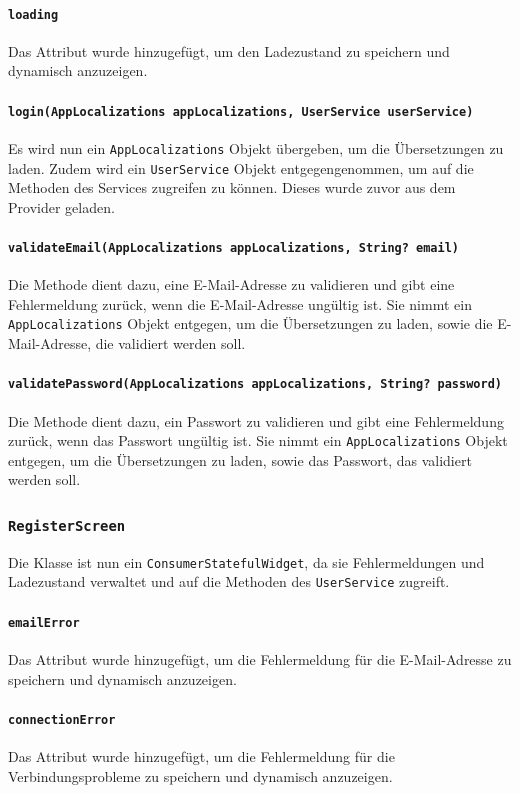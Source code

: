 \documentclass{implementierungsheft}
\begin{document}
\paragraph{\texttt{loading}}
Das Attribut wurde hinzugefügt, um den Ladezustand zu speichern und dynamisch anzuzeigen.
\paragraph{\texttt{login(AppLocalizations appLocalizations, UserService userService)}}
Es wird nun ein \texttt{AppLocalizations} Objekt übergeben, um die Übersetzungen zu laden. Zudem wird ein \texttt{UserSer\-vice} Objekt entgegengenommen, um auf die Methoden des Services zugreifen zu können. Dieses wurde zuvor aus dem Provider geladen.
\paragraph{\texttt{validateEmail(AppLocalizations appLocalizations, String? email)}}
Die Methode dient dazu, eine E-Mail-Adresse zu validieren und gibt eine Fehlermeldung zurück, wenn die E-Mail-Adresse ungültig ist. Sie nimmt ein \texttt{AppLocalizations} Objekt entgegen, um die Übersetzungen zu laden, sowie die E-Mail-Adresse, die validiert werden soll.
\paragraph{\texttt{validatePassword(AppLocalizations appLocalizations, String? password)}}
Die Methode dient dazu, ein Passwort zu validieren und gibt eine Fehlermeldung zurück, wenn das Passwort ungültig ist. Sie nimmt ein \texttt{AppLocalizations} Objekt entgegen, um die Übersetzungen zu laden, sowie das Passwort, das validiert werden soll.
\subsubsection{\texttt{RegisterScreen}}
Die Klasse ist nun ein \texttt{ConsumerStatefulWidget}, da sie Fehlermeldungen und Ladezustand verwaltet und auf die Methoden des \texttt{UserService} zugreift.
\paragraph{\texttt{emailError}}
Das Attribut wurde hinzugefügt, um die Fehlermeldung für die E-Mail-Adresse zu speichern und dynamisch anzuzeigen.
\paragraph{\texttt{connectionError}}
Das Attribut wurde hinzugefügt, um die Fehlermeldung für die Verbindungsprobleme zu speichern und dynamisch anzuzeigen.
\end{document}
